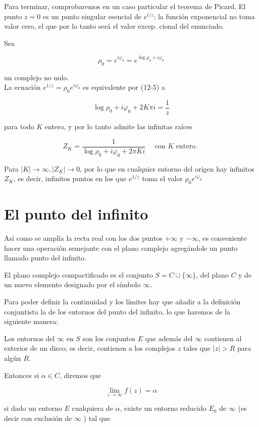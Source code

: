 \documentclass[10pt]{article}
\theoremstyle{plain}
\theoremstyle{definition}
\theoremstyle{remark}
\begin{document}
Para terminar, comprobaremos en un caso particular el teorema de Picard. El punto $z=0$ es un punto singular esencial de $e^{l / z}$; la función exponencial no toma valor cero, el que por lo tanto será el valor excep. cional del enunciado.

Sea

$$
\rho_{0}=e^{i \varphi_{0}}=e^{\log \rho_{0}+i \varphi_{0}}
$$

un complejo no nulo.\\
La ecuación $e^{1 / z}=\rho_{0} e^{i \varphi_{0}}$ es equivalente por (12-5) a

$$
\log \rho_{0}+i \varphi_{0}+2 K \pi i=\frac{1}{z}
$$

para todo $K$ entero, y por lo tanto admite las infinitas raíces

$$
Z_{K}=\frac{1}{\log \rho_{0}+i \varphi_{0}+2 \pi K i} \quad \text { con } K \text { entero. }
$$

Para $|K| \rightarrow \infty,\left|Z_{K}\right| \rightarrow 0$, por lo que en cualquier entorno del origen hay infinitos $Z_{K}$, es decir, infinitos puntos en los que $e^{1 / z}$ toma el valor $\rho_{0} e^{i \varphi_{0}}$

\section{El punto del infinito}
Así como se amplía la recta real con los dos puntos $+\infty$ y $-\infty$, es conveniente hacer una operación semejante con el plano complejo agregándole un punto llamado punto del infinito.

El plano complejo compactificado es el conjunto $S=C \cup\{\infty\}$, del plano $C$ y de un nuevo elemento designado por el símbolo $\infty$.

Para poder definir la continuidad y los límites hay que añadir a la definición conjuntista la de los entornos del punto del infinito, lo que haremos de la siguiente manera:

Los entornos del $\infty$ en $S$ son los conjuntos $E$ que además del $\infty$ contienen al exterior de un disco; es decir, contienen a los complejos $z$ tales que $|z|>R$ para algún $R$.

Entonces si $\alpha \in C$, diremos que

$$
\lim _{z \rightarrow \infty} f(z)=\alpha
$$

si dado un entorno $E$ cualquiera de $\alpha$, existe un entorno reducido $E_{0}$ de $\infty$ (es decir con exclusión de $\infty$ ) tal que
\end{document}
